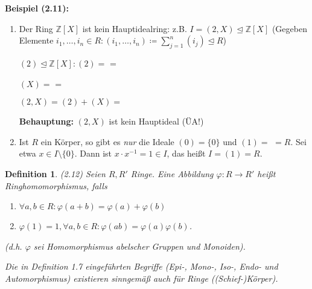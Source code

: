 \documentclass[10pt,a4paper]{article}
\newtheorem{defi}{Definition}
\begin{document}
\textbf{Beispiel (2.11):} \begin{enumerate}
\item Der Ring $\mathbb{Z}[X]$ ist kein Hauptidealring: z.B. $I = (2, X) \trianglelefteq \mathbb{Z}[X]$ (Gegeben Elemente $i_1, \dots , i_n \in R: (i_1, \dots , i_n) \coloneqq \sum_{j=1}^{n} (i_j) \trianglelefteq R$)

$(2) \trianglelefteq \mathbb{Z}[X]: (2) = $  =  

$(X) = $  =  

$(2,X) = (2) + (X) = $  

\textbf{Behauptung:} $(2,X)$ ist kein Hauptideal (ÜA!)

\item Ist $R$ ein Körper, so gibt es \emph{nur} die Ideale $(0) = \{0\}$ und $(1) = $  $= R$. Sei etwa $x \in I \setminus \{0\}$. Dann ist $x \cdot x^{-1} = 1 \in I$, das heißt $I = (1) = R$.

\end{enumerate}

\begin{defi}(2.12)
Seien $R, R'$ Ringe. Eine Abbildung $\varphi : R \to R'$ heißt \emph{Ringhomomorphismus}, falls \begin{enumerate}
\item $\forall a,b \in R: \varphi(a + b) = \varphi(a) + \varphi(b)$
\item $\varphi(1) = 1, \forall a,b \in R: \varphi(ab) = \varphi(a) \varphi(b)$.
\end{enumerate}
(d.h. $\varphi$ sei Homomorphismus abelscher Gruppen und Monoiden).

Die in Definition 1.7 eingeführten Begriffe (Epi-, Mono-, Iso-, Endo- und Automorphismus) existieren sinngemäß auch für Ringe ((Schief-)Körper).
\end{defi} 
\end{document}
